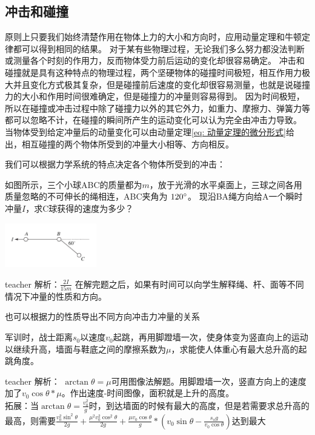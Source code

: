 \subsection{冲击和碰撞}
原则上只要我们始终清楚作用在物体上力的大小和方向时，应用动量定理和牛顿定律都可以得到相同的结果。
对于某有些物理过程，无论我们多么努力都没法判断或测量各个时刻的作用力，反而物体受力前后运动的变化却很容易确定。
冲击和碰撞就是具有这种特点的物理过程，两个坚硬物体的碰撞时间极短，相互作用力极大并且变化方式极其复杂，但是碰撞前后速度的变化却很容易测量，也就是说碰撞力的大小和作用时间很难确定，但是碰撞力的冲量则容易得到。
因为时间极短，所以在碰撞或冲击过程中除了碰撞力以外的其它外力，如重力、摩擦力、弹簧力等都可以忽略不计，在碰撞的瞬间所产生的运动变化可以认为完全由冲击力导致。
当物体受到给定冲量后的动量变化可以由动量定理\ref{eq: 动量定理的微分形式}给出，相互碰撞的两个物体所受到的冲量大小相等、方向相反。

我们可以根据力学系统的特点决定各个物体所受到的冲击：




\begin{example}
如图所示，三个小球ABC的质量都为$m$，放于光滑的水平桌面上，三球之间各用质量忽略的不可伸长的绳相连，ABC夹角为 $120^\circ$。
现沿BA绳方向给A一个瞬时冲量$I$，求C球获得的速度为多少？
\begin{flushright}
\includegraphics[width=0.3\textwidth]{images/momentum-problem-2.pdf}\end{flushright}
\begin{taggedblock}{teacher}
\noindent
解析：$\frac{2I}{15m}$
在解完题之后，如果有时间可以向学生解释绳、杆、面等不同情况下冲量的性质和方向。


也可以根据力的性质导出不同方向冲击力冲量的关系
\end{taggedblock}
\end{example}



\begin{example}

军训时，战士距离$s_0$以速度$v_0$起跳，再用脚蹬墙一次，使身体变为竖直向上的运动以继续升高，墙面与鞋底之间的摩擦系数为$\mu$，求能使人体重心有最大总升高的起跳角度。
\begin{taggedblock}{teacher}
\newline
解析：
$\arctan\theta=\mu$可用图像法解题。用脚蹬墙一次，竖直方向上的速度加了$v_0\cos\theta*\mu$。作出速度-时间图像，面积就是上升的高度。
\\
拓展：当$\arctan\theta=\frac{v_0^2}{g}$时，到达墙面的时候有最大的高度，但是若需要求总升高的最高，则需要$\frac{v_0^2\sin^2\theta}{2g}+\frac{\mu^2v_0^2\cos^2\theta}{2g}+\frac{\mu v_0\cos\theta}{g}*(v_0\sin\theta-\frac{s_og}{v_0\cos\theta})$达到最大
\end{taggedblock}
\end{example}


